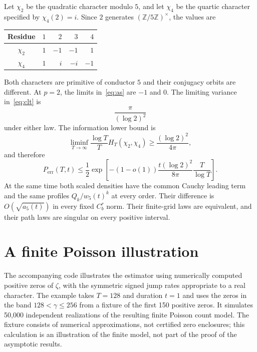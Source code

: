 \documentclass[11pt]{article}
\theoremstyle{definition}
\begin{document}
Let $\chi_2$ be the quadratic character modulo $5$, and let $\chi_4$ be the
quartic character specified by $\chi_4(2)=i$. Since $2$ generates
$(\mathbb Z/5\mathbb Z)^\times$, the values are
\begin{center}
\begin{tabular}{c@{\qquad}rrrr}
\toprule
Residue & $1$ & $2$ & $3$ & $4$\\
\midrule
$\chi_2$ & $1$ & $-1$ & $-1$ & $1$\\
$\chi_4$ & $1$ & $i$ & $-i$ & $-1$\\
\bottomrule
\end{tabular}
\end{center}
Both characters are primitive of conductor $5$ and their conjugacy orbits
are different. At $p=2$, the limits in~\eqref{eq:as} are $-1$ and $0$.
The limiting variance in~\eqref{eq:clt} is
\[
 \frac{\pi}{(\log2)^2}
\]
under either law. The information lower bound is
\[
 \liminf_{T\to\infty}\frac{\log T}{T}H_T(\chi_2,\chi_4)
       \ge\frac{(\log2)^2}{4\pi},
\]
and therefore
\[
 P_{\mathrm{err}}(T,t)
 \le\frac12\exp\left[-(1-o(1))
                 \frac{t(\log2)^2}{8\pi}\frac T{\log T}\right].
\]
At the same time both scaled densities have the common Cauchy leading term
and the same profiles $Q_k/w_5(t)^k$ at every order. Their difference is
$O(\sqrt{a_5(t)})$ in every fixed $C_b^r$ norm. Their finite-grid laws are
equivalent, and their path laws are singular on every positive interval.

\section{A finite Poisson illustration}
\label{sec:illustration}

The accompanying code illustrates the estimator using numerically computed
positive zeros of $\zeta$, with the symmetric signed jump rates appropriate
to a real character. The example takes $T=128$ and duration $t=1$ and uses
the zeros in the band $128<\gamma\le256$ from a fixture of the first 150
positive zeros. It simulates 50,000 independent realizations of the resulting
finite Poisson count model. The fixture consists of numerical approximations,
not certified zero enclosures; this calculation is an illustration of the
finite model, not part of the proof of the asymptotic results.
\end{document}

